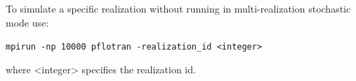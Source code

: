 \documentclass[12pt]{article}
\begin{document}
\noindent
To simulate a specific realization without running in multi-realization stochastic mode use:

{\tt mpirun -np 10000 pflotran -realization\_id <integer>}

\noindent
where <integer> specifies the realization id.

\end{document}
